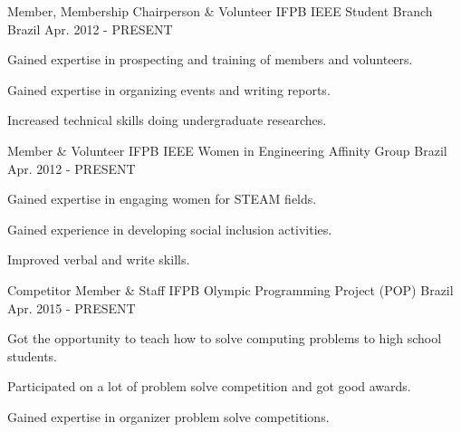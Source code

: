 

\begin{cventries}

  \cventry
    {Member, Membership Chairperson \& Volunteer} %
    {IFPB IEEE Student Branch} %
    {Brazil} %
    {Apr. 2012 - PRESENT} %
    {
      \begin{cvitems} %
        \item {Gained expertise in prospecting and training of members and volunteers.}
        \item {Gained expertise in organizing events and writing reports.}
        \item {Increased technical skills doing undergraduate researches.}
      \end{cvitems}
    }
    
  \cventry
    {Member \& Volunteer} %
    {IFPB IEEE Women in Engineering Affinity Group} %
    {Brazil} %
    {Apr. 2012 - PRESENT} %
    {
      \begin{cvitems} %
        \item {Gained expertise in engaging women for STEAM fields.}
        \item {Gained experience in developing social inclusion activities.}
        \item {Improved verbal and write skills.}
      \end{cvitems}
    }

  \cventry
    {Competitor Member \& Staff} %
    {IFPB Olympic Programming Project (POP)} %
    {Brazil} %
    {Apr. 2015 - PRESENT} %
    {
      \begin{cvitems} %
        \item {Got the opportunity to teach how to solve computing problems to high school students.}
        \item {Participated on a lot of problem solve competition and got good awards.}
        \item {Gained expertise in organizer problem solve competitions.}
      \end{cvitems}
    }


\end{cventries}
